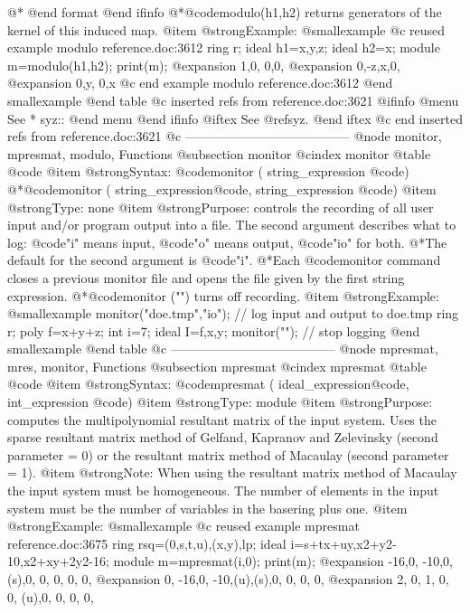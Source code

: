 {@*
@end format
@end ifinfo
@*@code{modulo(h1,h2)} returns generators of
the kernel of this induced map.
@item @strong{Example:}
@smallexample
@c reused example modulo reference.doc:3612 
  ring r;
  ideal h1=x,y,z;
  ideal h2=x;
  module m=modulo(h1,h2);
  print(m);
@expansion{} 1,0, 0,0,
@expansion{} 0,-z,x,0,
@expansion{} 0,y, 0,x 
@c end example modulo reference.doc:3612
@end smallexample
@end table
@c inserted refs from reference.doc:3621
@ifinfo
@menu
See
* syz::
@end menu
@end ifinfo
@iftex
See
@ref{syz}.
@end iftex
@c end inserted refs from reference.doc:3621
@c ---------------------------------------
@node monitor, mpresmat, modulo, Functions
@subsection monitor
@cindex monitor
@table @code
@item @strong{Syntax:}
@code{monitor (} string_expression @code{)}
@*@code{monitor (} string_expression@code{,} string_expression @code{)}
@item @strong{Type:}
none
@item @strong{Purpose:}
controls the recording of all user input and/or program output into a file.
The second argument describes what to log: @code{"i"} means input,
@code{"o"} means output, @code{"io"} for both.
@*The default for the second argument is @code{"i"}.
@*Each @code{monitor} command closes a previous monitor file
and opens the file given by the first string expression.
@*@code{monitor ("")} turns off recording.
@item @strong{Example:}
@smallexample
  monitor("doe.tmp","io"); // log input and output to doe.tmp
  ring r;
  poly f=x+y+z;
  int i=7;
  ideal I=f,x,y;
  monitor("");             // stop logging
@end smallexample
@end table
@c ---------------------------------------
@node mpresmat, mres, monitor, Functions
@subsection mpresmat
@cindex mpresmat
@table @code
@item @strong{Syntax:}
@code{mpresmat (} ideal_expression@code{,} int_expression @code{)}
@item @strong{Type:}
module
@item @strong{Purpose:}
computes the multipolynomial resultant matrix of the input system.
Uses the sparse resultant matrix method of Gelfand, Kapranov and Zelevinsky
(second parameter = 0) or the resultant matrix method of Macaulay
(second parameter = 1).
@item @strong{Note:}
When using the resultant matrix method of Macaulay the input system must be
homogeneous. The number of elements in the input system must be the number of
variables in the basering plus one.
@item @strong{Example:}
@smallexample
@c reused example mpresmat reference.doc:3675 
  ring rsq=(0,s,t,u),(x,y),lp;
  ideal i=s+tx+uy,x2+y2-10,x2+xy+2y2-16;
  module m=mpresmat(i,0);
  print(m);
@expansion{} -16,0,  -10,0,  (s),0,  0,  0,  0,  0,  
@expansion{} 0,  -16,0,  -10,(u),(s),0,  0,  0,  0,  
@expansion{} 2,  0,  1,  0,  0,  (u),0,  0,  0,  0,  
}
